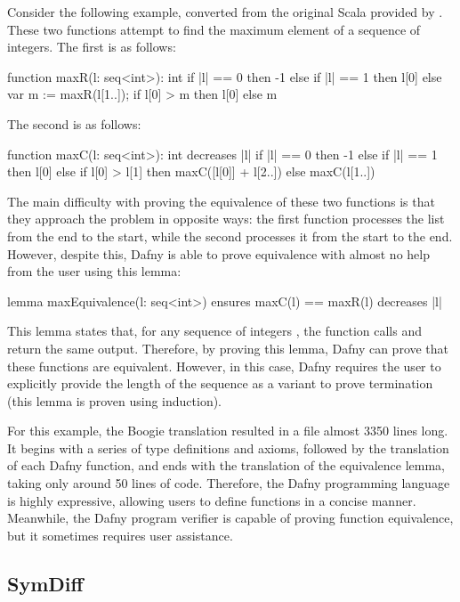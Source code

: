 Consider the following example, converted from the original Scala provided by \textcite{milovancevicProvingDisprovingEquivalence2023}. These two functions attempt to find the maximum element of a sequence of integers. The first is as follows:
%
\begin{dafny}
function maxR(l: seq<int>): int
{
  if |l| == 0 then -1
  else if |l| == 1 then l[0]
  else
    var m := maxR(l[1..]);
    if l[0] > m then l[0] else m
}
\end{dafny}
%
The second is as follows:
\begin{dafny}
function maxC(l: seq<int>): int
  decreases |l|
{
  if |l| == 0 then -1
  else if |l| == 1 then l[0]
  else
    if l[0] > l[1] then
      maxC([l[0]] + l[2..])
    else
      maxC(l[1..])
}
\end{dafny}
%
The main difficulty with proving the equivalence of these two functions is that they approach the problem in opposite ways: the first function processes the list from the end to the start, while the second processes it from the start to the end. However, despite this, Dafny is able to prove equivalence with almost no help from the user using this lemma:
\begin{dafny}
lemma maxEquivalence(l: seq<int>)
  ensures maxC(l) == maxR(l)
  decreases |l|
{}
\end{dafny}
%
This lemma states that, for any sequence of integers , the function calls  and  return the same output. Therefore, by proving this lemma, Dafny can prove that these functions are equivalent. However, in this case, Dafny requires the user to explicitly provide the length of the sequence  as a variant to prove termination (this lemma is proven using induction).

For this example, the Boogie translation resulted in a file almost 3350 lines long. It begins with a series of type definitions and axioms, followed by the translation of each Dafny function, and ends with the translation of the equivalence lemma, taking only around 50 lines of code. Therefore, the Dafny programming language is highly expressive, allowing users to define functions in a concise manner. Meanwhile, the Dafny program verifier is capable of proving function equivalence, but it sometimes requires user assistance.

\subsection{SymDiff}

